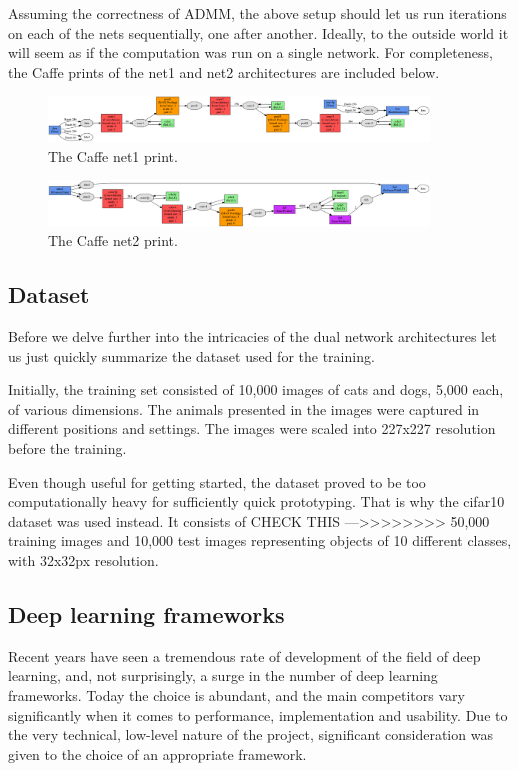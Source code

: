 \documentclass[a4paper, 11pt]{article}
\numberwithin{equation}{section}
\begin{document}
	Assuming the correctness of ADMM, the above setup should let us run iterations on each of the nets sequentially, one after another. Ideally, to the outside world it will seem as if the computation was run on a single network. For completeness, the Caffe prints of the net1 and net2 architectures are included below.
	
	\begin{figure}[!h]
		\centering
		\includegraphics[page=1,width=0.9\textwidth]{net1.png}
		\caption{\label{fig:net1}{The Caffe net1 print.}}
	\end{figure}
	
	\begin{figure}[!h]
		\centering
		\includegraphics[page=1,width=0.9\textwidth]{net2.png}
		\caption{\label{fig:net1}{The Caffe net2 print.}}
	\end{figure}
	
	\subsection{Dataset}
	
	Before we delve further into the intricacies of the dual network architectures let us just quickly summarize the dataset used for the training.
	
	Initially, the training set consisted of 10,000 images of cats and dogs, 5,000 each, of various dimensions. The animals presented in the images were captured in different positions and settings. The images were scaled into 227x227 resolution before the training.
	
	Even though useful for getting started, the dataset proved to be too computationally heavy for sufficiently quick prototyping. That is why the cifar10 dataset was used instead. It consists of CHECK THIS --->>>>>>>> 50,000 training images and 10,000 test images representing objects of 10 different classes, with 32x32px resolution.
	
	\subsection{Deep learning frameworks}
	Recent years have seen a tremendous rate of development of the field of deep learning, and, not surprisingly, a surge in the number of deep learning frameworks. Today the choice is abundant, and the main competitors vary significantly when it comes to performance, implementation and usability. Due to the very technical, low-level nature of the project, significant consideration was given to the choice of an appropriate framework.
	
\end{document}

